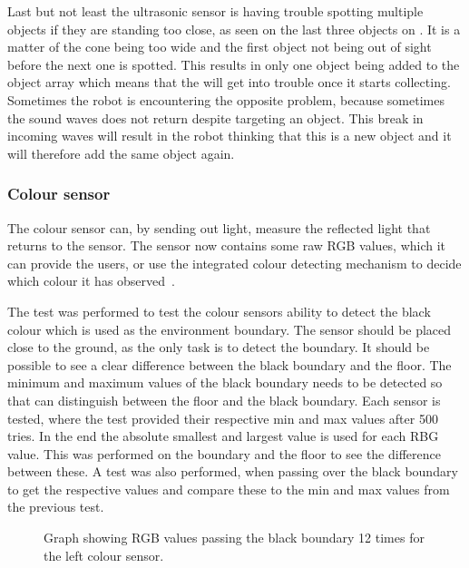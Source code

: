 Last but not least the ultrasonic sensor is having trouble spotting multiple objects if they are standing too close, as seen on the last three objects on . It is a matter of the cone being too wide and the first object not being out of sight before the next one is spotted. This results in only one object being added to the object array which means that the \projname{} will get into trouble once it starts collecting.\\
Sometimes the robot is encountering the opposite problem, because sometimes the sound waves does not return despite targeting an object. This break in incoming waves will result in the robot thinking that this is a new object and it will therefore add the same object again.

\subsubsection{Colour sensor} \label{sec:colour_sensor} 
The colour sensor can, by sending out light, measure the reflected light that returns to the sensor. The sensor now contains some raw RGB values, which it can provide the users, or use the integrated colour detecting mechanism to decide which colour it has observed~\citep{lego_education}. 

The test was performed to test the colour sensors ability to detect the black colour which is used as the environment boundary. The sensor should be placed close to the ground, as the only task is to detect the boundary. It should be possible to see a clear difference between the black boundary and the floor. The minimum and maximum values of the black boundary needs to be detected so that \projname{} can distinguish between the floor and the black boundary. Each sensor is tested, where the test provided their respective min and max values after 500 tries. In the end the absolute smallest and largest value is used for each RBG value. This was performed on the boundary and the floor to see the difference between these. A test was also performed, when passing over the black boundary to get the respective values and compare these to the min and max values from the previous test.

\begin{figure}[H]
     \caption{\label{fig:colour_sensor_test_left} Graph showing RGB values passing the black boundary 12 times for the left colour sensor.}
\end{figure}

